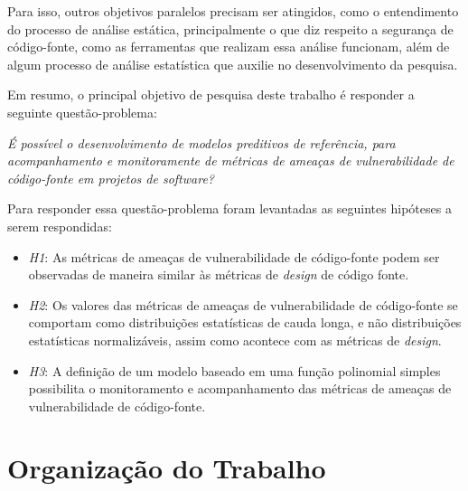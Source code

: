 Para isso, outros objetivos paralelos precisam ser atingidos, como o
entendimento do processo de análise estática, principalmente o que diz respeito
a segurança de código-fonte, como as ferramentas que realizam essa análise
funcionam, além de algum processo de análise estatística que auxilie no
desenvolvimento da pesquisa.

Em resumo, o principal objetivo de pesquisa deste trabalho é responder a
seguinte questão-problema:

\begin{center}
  \textit{É possível o desenvolvimento de modelos preditivos de referência, para
  acompanhamento e monitoramente de métricas de ameaças de vulnerabilidade de
código-fonte em projetos de software?}
\end{center}

Para responder essa questão-problema foram levantadas as seguintes hipóteses
a serem respondidas:

\begin{itemize}
  \item \textit{H1}: As métricas de ameaças de vulnerabilidade de código-fonte
  podem ser observadas de maneira similar às métricas de \textit{design} de código
  fonte.

  \item \textit{H2}: Os valores das métricas de ameaças de vulnerabilidade de
    código-fonte se comportam como distribuições estatísticas de cauda longa, e
    não distribuições estatísticas normalizáveis, assim como acontece com as
    métricas de \textit{design}.

  \item \textit{H3}: A definição de um modelo baseado em uma função polinomial
   simples possibilita o monitoramento e acompanhamento das métricas de ameaças
   de vulnerabilidade de código-fonte.
\end{itemize}


\section{Organização do Trabalho}

